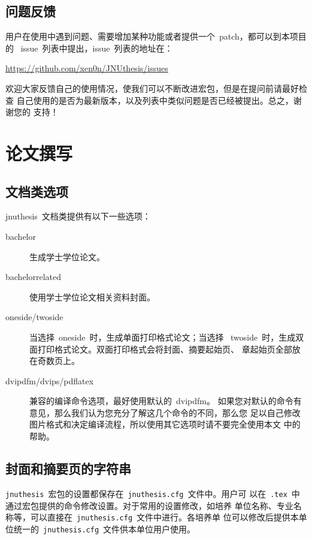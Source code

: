 \documentclass[pdftex, twoside, bachelor]{JNUthesis}
\begin{document}
\begin{spacing}{1.25}
\section{问题反馈}

用户在使用中遇到问题、需要增加某种功能或者提供一个~patch，都可以到本项目的
~issue~列表中提出，issue~列表的地址在：

\begin{center}
\url{https://github.com/xen0n/JNUthesis/issues}
\end{center}

欢迎大家反馈自己的使用情况，使我们可以不断改进宏包，但是在提问前请最好检查
自己使用的是否为最新版本，以及列表中类似问题是否已经被提出。总之，谢谢您的
支持！

\chapter{论文撰写}

\section{文档类选项}

jnuthesis~文档类提供有以下一些选项：

\begin{description}

\item[bachelor] 生成学士学位论文。

\item[bachelorrelated] 使用学士学位论文相关资料封面。

\item[oneside/twoside] 当选择~oneside~时，生成单面打印格式论文；当选择
~twoside~时，生成双面打印格式论文。双面打印格式会将封面、摘要起始页、
章起始页全部放在奇数页上。

\item[dvipdfm/dvips/pdflatex] 兼容的编译命令选项，最好使用默认的~dvipdfm。
如果您对默认的命令有意见，那么我们认为您充分了解这几个命令的不同，那么您
足以自己修改图片格式和决定编译流程，所以使用其它选项时请不要完全使用本文
中的帮助。

\end{description}

\section{封面和摘要页的字符串}

\texttt{jnuthesis}~宏包的设置都保存在~\texttt{jnuthesis.cfg}~文件中。用户可
以在~\texttt{.tex}~中通过宏包提供的命令修改设置。对于常用的设置修改，如培养
单位名称、专业名称等，可以直接在~\texttt{jnuthesis.cfg}~文件中进行。各培养单
位可以修改后提供本单位统一的~\texttt{jnuthesis.cfg}~文件供本单位用户使用。


\end{spacing}
\end{document}
